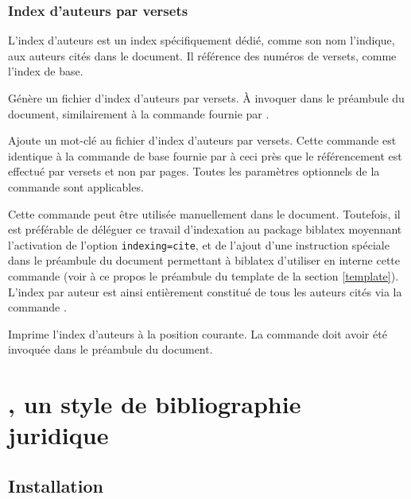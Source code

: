 \documentclass{ltxdockit}
\newcommand*{\bibstylename}{droit-fr\xspace}
\begin{document}
\subsubsection{Index d'auteurs par versets}
\label{indexauteurs}

L'index d'auteurs est un index spécifiquement dédié, comme son nom l'indique, aux auteurs cités dans le document. Il référence des numéros de versets, comme l'index de base.

\begin{ltxsyntax}


Génère un fichier d'index d'auteurs par versets. À invoquer dans le préambule du document, similairement à la commande  fournie par \latex.


Ajoute un mot-clé au fichier d'index d'auteurs par versets. Cette commande est identique à la commande de base  fournie par \latex à ceci près que le référencement est effectué par versets et non par pages. Toutes les paramètres optionnels de la commande  sont applicables.

Cette commande peut être utilisée manuellement dans le document. Toutefois, il est préférable de déléguer ce travail d'indexation au package biblatex moyennant l'activation de l'option \texttt{indexing=cite}, et de l'ajout d'une instruction spéciale dans le préambule du document permettant à biblatex d'utiliser en interne cette commande  (voir à ce propos le préambule du template de la section \ref{template}). L'index par auteur est ainsi entièrement constitué de tous les auteurs cités via la commande .


Imprime l'index d'auteurs à la position courante. La commande  doit avoir été invoquée dans le préambule du document.

\end{ltxsyntax}




\section{\sty{\bibstylename}, un style de bibliographie juridique}
\label{bibliographie}

\subsection{Installation}
\end{document}
